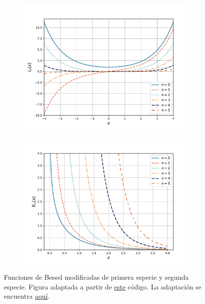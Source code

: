 \begin{figure}[htbp]
    \centering
    \begin{subfigure}{\textwidth}
        \centering
        \includegraphics[width = 10cm]{Figuras/Bessel-modified-first-kind.pdf}
        \caption{\label{fig:Bessel_modificada_primera}}
    \end{subfigure}
    \begin{subfigure}{\textwidth}
        \centering
        \includegraphics[width = 10cm]{Figuras/Bessel-modified-second-kind.pdf}
        \caption{\label{fig:Bessel_modificada_segunda}}
    \end{subfigure}
    \caption{Funciones de Bessel modificadas de  primera especie y  segunda especie. Figura adaptada a partir de \href{https://github.com/gfrubi/FM2/blob/master/figuras-editables/fig-Bessel.py}{este} código. La adaptación se encuentra \href{aa}{aquí}.}
    \label{fig:Bessel_modificada}
\end{figure}


